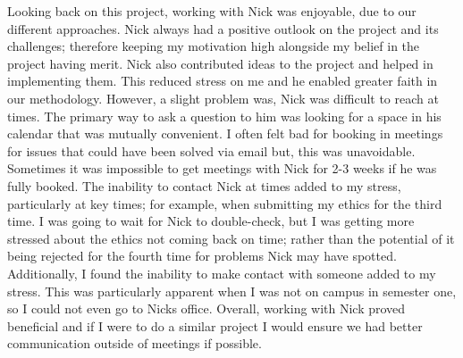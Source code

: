 Looking back on this project, working with Nick was enjoyable, due to our different approaches. Nick always had a positive outlook on the project and its challenges; therefore keeping my motivation high alongside my belief in the project having merit. Nick also contributed ideas to the project and helped in implementing them. This reduced stress on me and he enabled greater faith in our methodology. However, a slight problem was, Nick was difficult to reach at times. The primary way to ask a question to him was looking for a space in his calendar that was mutually convenient. I often felt bad for booking in meetings for issues that could have been solved via email but, this was unavoidable. Sometimes it was impossible to get meetings with Nick for 2-3 weeks if he was fully booked. The inability to contact Nick at times added to my stress, particularly at key times; for example, when submitting my ethics for the third time. I was going to wait for Nick to double-check, but I was getting more stressed about the ethics not coming back on time; rather than the potential of it being rejected for the fourth time for problems Nick may have spotted. Additionally, I found the inability to make contact with someone added to my stress. This was particularly apparent when I was not on campus in semester one, so I could not even go to Nicks office. Overall, working with Nick proved beneficial and if I were to do a similar project I would ensure we had better communication outside of meetings if possible.



